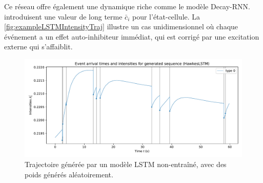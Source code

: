 \documentclass[../main.tex]{subfiles}
\begin{document}
Ce réseau offre également une dynamique riche comme le modèle Decay-RNN. \citeauthor{meiEisnerNeuralHawkes} introduisent une valeur de long terme $\bar{c}_i$ pour l'état-cellule. La \autoref{fig:exampleLSTMIntensityTraj} illustre un cas unidimensionnel où chaque événement a un effet auto-inhibiteur immédiat, qui est corrigé par une excitation externe qui s'affaiblit.

\begin{figure}
	\includegraphics[width=\linewidth]{../notebooks/example_lstmplot.pdf}
	\caption{Trajectoire générée par un modèle LSTM non-entraîné, avec des poids générés aléatoirement.}\label{fig:exampleLSTMIntensityTraj}
\end{figure}
\end{document}
